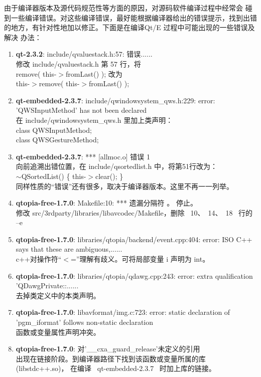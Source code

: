	由于编译器版本及源代码规范性等方面的原因，对源码软件编译过程中经常会
碰到一些编译错误。对这些编译错误，最好能根据编译器给出的错误提示，找到出错
的地方，有针对性地加以修正。下面是在编译Qt/E 过程中可能出现的一些错误及解决
办法：
\begin{enumerate}\itemsep=-3pt
  \item {\bf qt-2.3.2}: include/qvaluestack.h:57: 错误......\\
		修改 include/qvaluestack.h 第 57 行，将\\
		remove( this-$>$fromLast() ); 改为\\
		this-$>$remove( this-$>$fromLast() );
  \item {\bf qt-embedded-2.3.7}: include/qwindowsystem\_qws.h:229: error:
		'QWSInputMethod' has not been declared\\
		在 include/qwindowsystem\_qws.h 里加上类声明：\\
		class   QWSInputMethod;\\
		class   QWSGestureMethod;
  \item {\bf qt-embedded-2.3.7}: *** [allmoc.o] 错误 1\\
		向前追溯出错位置，在 include/qsortedlist.h 中，将第51行改为：\\
		$\sim$QSortedList() \{ this-$>$clear(); \}\\
		同样性质的``错误''还有很多，取决于编译器版本。这里不再一一列举。
  \item {\bf qtopia-free-1.7.0}: Makefile:10: *** 遗漏分隔符 。 停止。\\
		修改 src/3rdparty/libraries/libavcodec/Makefile，删除 ~10、~14、~18~
		行的 --e
  \item {\bf qtopia-free-1.7.0}: libraries/qtopia/backend/event.cpp:404:
		error: ISO C++ says that these are ambiguous,......\\
		c++对操作符``$<$=''理解有歧义。可将局部变量 i 声明为 int。
  \item {\bf qtopia-free-1.7.0}: libraries/qtopia/qdawg.cpp:243: error:
		extra qualification 'QDawgPrivate::......\\
		去掉类定义中的本类声明。
  \item {\bf qtopia-free-1.7.0}: libavformat/img.c:723: error: static
		declaration of 'pgm\_iformat' follows non-static declaration\\
		函数或变量属性声明冲突。
  \item {\bf qtopia-free-1.7.0}: 对'\_\_cxa\_guard\_release'未定义的引用\\
		出现在链接阶段。到编译器路径下找到该函数或变量所属的库(libstdc++.so)，
		在编译 ~qt-embedded-2.3.7~ 时加上库的链接。
\end{enumerate}
\rm\normalsize
